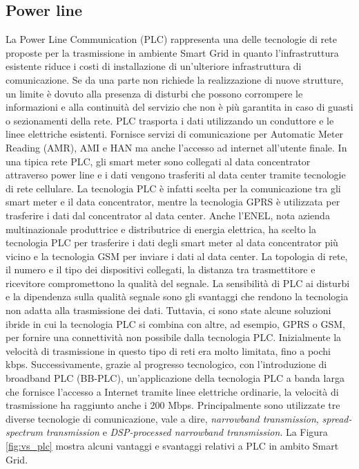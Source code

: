 \subsection{Power line}
La Power Line Communication (PLC) rappresenta una delle tecnologie di rete proposte per la trasmissione in ambiente Smart Grid in quanto l'infrastruttura esistente riduce i costi di installazione di un'ulteriore infrastruttura di comunicazione. Se da una parte non richiede la realizzazione di nuove strutture, un limite è dovuto alla presenza di disturbi che possono corrompere le informazioni e alla continuità del servizio che non è più garantita in caso di guasti o sezionamenti della rete. PLC trasporta i dati utilizzando un conduttore e le linee elettriche esistenti. Fornisce servizi di comunicazione per Automatic Meter Reading (AMR), AMI e HAN ma anche l'accesso ad internet all'utente finale. In una tipica rete PLC, gli smart meter sono collegati al data concentrator attraverso power line e i dati vengono trasferiti al data center tramite tecnologie di rete cellulare. La tecnologia PLC è infatti scelta per la comunicazione tra gli smart meter e il data concentrator, mentre la tecnologia GPRS è utilizzata per trasferire i dati dal concentrator al data center. Anche l'ENEL, nota azienda multinazionale produttrice e distributrice di energia elettrica, ha scelto la tecnologia PLC per trasferire i dati degli smart meter al data concentrator più vicino e la tecnologia GSM per inviare i dati al data center. 
La topologia di rete, il numero e il tipo dei dispositivi collegati, la distanza tra trasmettitore e ricevitore compromettono la qualità del segnale. La sensibilità di PLC ai disturbi e la dipendenza sulla qualità segnale sono gli svantaggi che rendono la tecnologia non adatta alla trasmissione dei dati. Tuttavia, ci sono state alcune soluzioni ibride in cui la tecnologia PLC si combina con altre, ad esempio, GPRS o GSM, per fornire una connettività non possibile dalla tecnologia PLC. Inizialmente la velocità di trasmissione in questo tipo di reti era molto limitata, fino a pochi kbps. Successivamente, grazie al progresso tecnologico, con l'introduzione di broadband PLC (BB-PLC), un'applicazione della tecnologia PLC a banda larga che fornisce l'accesso a Internet tramite linee elettriche ordinarie, la velocità di trasmissione ha raggiunto anche i 200 Mbps. Principalmente sono utilizzate tre diverse tecnologie di comunicazione, vale a dire, \emph{narrowband transmission}, \emph{spread-spectrum transmission} e \emph{DSP-processed narrowband transmission}. La Figura \ref{fig:vs_plc} mostra alcuni vantaggi e svantaggi relativi a PLC in ambito Smart Grid.
